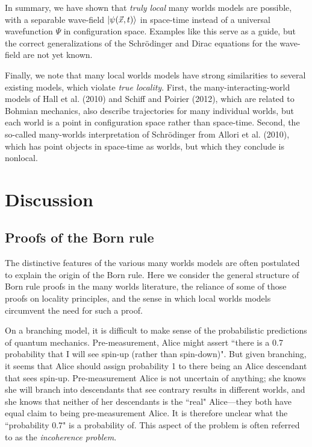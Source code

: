 \documentclass[12pt]{article}
\begin{document}
In summary, we have shown that \textit{truly local} many worlds models are possible, with a separable wave-field $\Ket{\psi(\vec{x},t)}$ in space-time instead of a universal wavefunction $\Psi$ in configuration space.  Examples like this serve as a guide, but the correct generalizations of the Schr\"{o}dinger and Dirac equations for the wave-field are not yet known.

Finally, we note that many local worlds models have strong similarities to several existing models, which violate \textit{true locality}.  First, the many-interacting-world models of Hall et al. (2010) and Schiff and Poirier (2012), which are related to Bohmian mechanics, also describe trajectories for many individual worlds, but each world is a point in configuration space rather than space-time.  Second, the so-called many-worlds interpretation of Schr\"{o}dinger from Allori et al. (2010), which has point objects in space-time as worlds, but which they conclude is nonlocal. 



\section{Discussion}  \label{Discussion}

\subsection{Proofs of the Born rule}\label{Born}

The distinctive features of the various many worlds models are often postulated to explain the origin of the Born rule. Here we consider the general structure of Born rule proofs in the many worlds literature, the reliance of some of those proofs on locality principles, and the sense in which local worlds models circumvent the need for such a proof.

On a branching model, it is difficult to make sense of the probabilistic predictions of quantum mechanics. Pre-measurement, Alice might assert ``there is a 0.7 probability that I will see spin-up (rather than spin-down)". But given branching, it seems that Alice should assign probability 1 to there being an Alice descendant that sees spin-up. Pre-measurement Alice is not uncertain of anything; she knows she will branch into descendants that see contrary results in different worlds, and she knows that neither of her descendants is the ``real" Alice---they both have equal claim to being pre-measurement Alice. It is therefore unclear what the ``probability 0.7" is a probability of. This aspect of the problem is often referred to as the \textit{incoherence problem}. 
\end{document}

